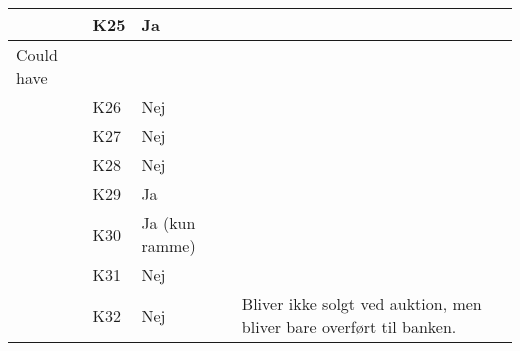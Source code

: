 \documentclass[class=article, crop=false]{standalone}
\begin{document}
\begin{table}[]
\begin{tabular}{|l|l|l|l|}
            & K25      & Ja                 &                                                                                                                                                                                                    \\ \hline
            Could have      &          &                    &                                                                                                                                                                                                    \\ \hline
            & K26      & Nej                &                                                                                                                                                                                                    \\ \hline
            & K27      & Nej                &                                                                                                                                                                                                    \\ \hline
            & K28      & Nej                &                                                                                                                                                                                                    \\ \hline
            & K29      & Ja                 &                                                                                                                                                                                                    \\ \hline
            & K30      & Ja (kun ramme)     &                                                                                                                                                                                                    \\ \hline
            & K31      & Nej                &                                                                                                                                                                                                    \\ \hline
            & K32      & Nej                & Bliver ikke solgt ved auktion, men bliver bare overført til banken.                                                                                                                                \\ \hline

\end{tabular}
\end{table}
\end{document}
